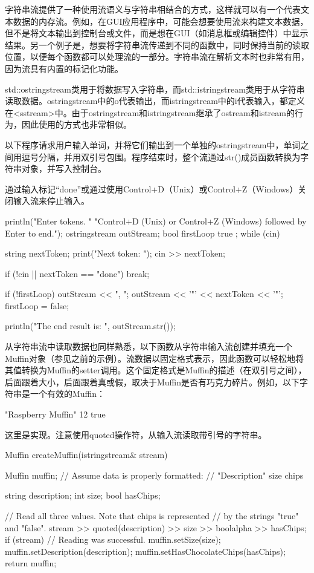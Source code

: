 字符串流提供了一种使用流语义与字符串相结合的方式，这样就可以有一个代表文本数据的内存流。例如，在GUI应用程序中，可能会想要使用流来构建文本数据，但不是将文本输出到控制台或文件，而是想在GUI（如消息框或编辑控件）中显示结果。另一个例子是，想要将字符串流传递到不同的函数中，同时保持当前的读取位置，以便每个函数都可以处理流的一部分。字符串流在解析文本时也非常有用，因为流具有内置的标记化功能。

std::ostringstream类用于将数据写入字符串，而std::istringstream类用于从字符串读取数据。ostringstream中的o代表输出，而istringstream中的i代表输入，都定义在<sstream>中。由于ostringstream和istringstream继承了ostream和istream的行为，因此使用的方式也非常相似。

以下程序请求用户输入单词，并将它们输出到一个单独的ostringstream中，单词之间用逗号分隔，并用双引号包围。程序结束时，整个流通过str()成员函数转换为字符串对象，并写入控制台。

通过输入标记“done”或通过使用Control+D（Unix）或Control+Z（Windows）关闭输入流来停止输入。

\begin{cpp}
println("Enter tokens. "
        "Control+D (Unix) or Control+Z (Windows) followed by Enter to end.");
ostringstream outStream;
bool firstLoop { true };
while (cin) {
    string nextToken;
    print("Next token: ");
    cin >> nextToken;

    if (!cin || nextToken == "done") { break; }

    if (!firstLoop) { outStream << ", "; }
    outStream << '"' << nextToken << '"';
    firstLoop = false;
}
println("The end result is: {}", outStream.str());
\end{cpp}

从字符串流中读取数据也同样熟悉，以下函数从字符串输入流创建并填充一个Muffin对象（参见之前的示例）。流数据以固定格式表示，因此函数可以轻松地将其值转换为Muffin的setter调用。这个固定格式是Muffin的描述（在双引号之间），后面跟着大小，后面跟着真或假，取决于Muffin是否有巧克力碎片。例如，以下字符串是一个有效的Muffin：

\begin{shell}
"Raspberry Muffin" 12 true
\end{shell}

这里是实现。注意使用quoted操作符，从输入流读取带引号的字符串。

\begin{cpp}
Muffin createMuffin(istringstream& stream)
{
    Muffin muffin;
    // Assume data is properly formatted:
    // "Description" size chips

    string description;
    int size;
    bool hasChips;

    // Read all three values. Note that chips is represented
    // by the strings "true" and "false".
    stream >> quoted(description) >> size >> boolalpha >> hasChips;
    if (stream) { // Reading was successful.
        muffin.setSize(size);
        muffin.setDescription(description);
        muffin.setHasChocolateChips(hasChips);
    }
    return muffin;
}
\end{cpp}

